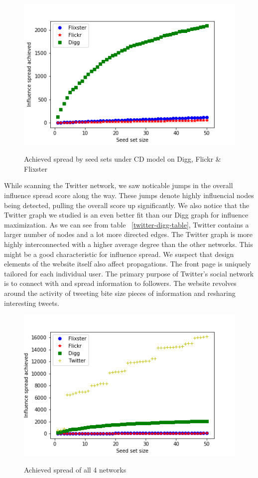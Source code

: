 \documentclass{acm_proc_article-sp}
\begin{document}
\begin{figure}[h]
	\includegraphics[width=\linewidth]{spread3.png}
	\centering
	\label{spread3}
    \caption{Achieved spread by seed sets under CD model on Digg, Flickr \& Flixster}
\end{figure}

While scanning the Twitter network, we saw noticable jumps in the overall influence spread score along the way. These jumps denote highly influencial nodes being detected, pulling the overall score up significantly. We also notice that the Twitter graph we studied is an even better fit than our Digg graph for influence maximization. As we can see from table ~\ref{twitter-digg-table}, Twitter contains a larger number of nodes and a lot more directed edges. The Twitter graph is more highly interconnected with a higher average degree than the other networks. This might be a good characteristic for influence spread. We suspect that design elements of the website itself also affect propagations. The front page is uniquely tailored for each individual user. The primary purpose of Twitter's social network is to connect with and spread information to followers. The website revolves around the activity of tweeting bite size pieces of information and resharing interesting tweets.

\begin{figure}[h]
	\includegraphics[width=\linewidth]{spread4.png}
	\centering
	\label{spreadall}
    \caption{Achieved spread of all 4 networks}
\end{figure}
\end{document}
